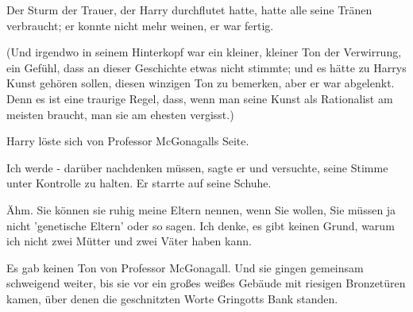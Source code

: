 Der Sturm der Trauer, der Harry durchflutet hatte, hatte alle seine Tränen
verbraucht; er konnte nicht mehr weinen, er war fertig.

(Und irgendwo in seinem Hinterkopf war ein kleiner, kleiner Ton der Verwirrung,
ein Gefühl, dass an dieser Geschichte etwas nicht stimmte; und es hätte zu
Harrys Kunst gehören sollen, diesen winzigen Ton zu bemerken, aber er war
abgelenkt. Denn es ist eine traurige Regel, dass, wenn man seine Kunst als
Rationalist am meisten braucht, man sie am ehesten vergisst.)

Harry löste sich von Professor McGonagalls Seite.

\glqq{}Ich werde - darüber nachdenken müssen\grqq{}, sagte er und versuchte,
seine Stimme unter Kontrolle zu halten. Er starrte auf seine Schuhe.

\glqq{}Ähm. Sie können sie ruhig meine Eltern nennen, wenn Sie wollen, Sie müssen
ja nicht 'genetische Eltern' oder so sagen. Ich denke, es gibt keinen Grund,
warum ich nicht zwei Mütter und zwei Väter haben kann.\grqq{}

Es gab keinen Ton von Professor McGonagall. Und sie gingen gemeinsam schweigend
weiter, bis sie vor ein großes weißes Gebäude mit riesigen Bronzetüren kamen,
über denen die geschnitzten Worte \glqq{}Gringotts Bank\grqq{} standen.
